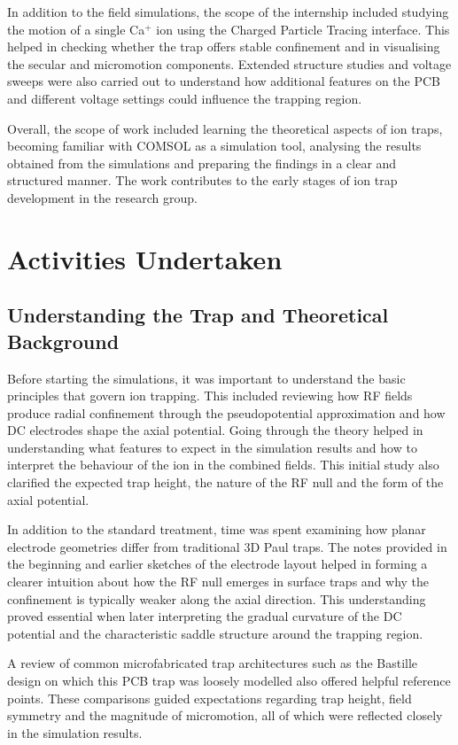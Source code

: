\documentclass[12pt,a4paper]{report}
\begin{document}
In addition to the field simulations, the scope of the internship included studying the motion of a single Ca$^{+}$ ion using the Charged Particle Tracing interface. This helped in checking whether the trap offers stable confinement and in visualising the secular and micromotion components. Extended structure studies and voltage sweeps were also carried out to understand how additional features on the PCB and different voltage settings could influence the trapping region.

Overall, the scope of work included learning the theoretical aspects of ion traps, becoming familiar with COMSOL as a simulation tool, analysing the results obtained from the simulations and preparing the findings in a clear and structured manner. The work contributes to the early stages of ion trap development in the research group.

\chapter*{Activities Undertaken}

\section*{Understanding the Trap and Theoretical Background}
Before starting the simulations, it was important to understand the basic principles that govern ion trapping. This included reviewing how RF fields produce radial confinement through the pseudopotential approximation and how DC electrodes shape the axial potential. Going through the theory helped in understanding what features to expect in the simulation results and how to interpret the behaviour of the ion in the combined fields. This initial study also clarified the expected trap height, the nature of the RF null and the form of the axial potential.

In addition to the standard treatment, time was spent examining how planar electrode geometries differ from traditional 3D Paul traps. The notes provided in the beginning and earlier sketches of the electrode layout helped in forming a clearer intuition about how the RF null emerges in surface traps and why the confinement is typically weaker along the axial direction. This understanding proved essential when later interpreting the gradual curvature of the DC potential and the characteristic saddle structure around the trapping region.

A review of common microfabricated trap architectures such as the Bastille design on which this PCB trap was loosely modelled also offered helpful reference points. These comparisons guided expectations regarding trap height, field symmetry and the magnitude of micromotion, all of which were reflected closely in the simulation results.
\end{document}
